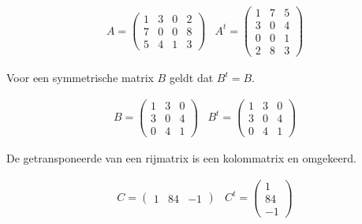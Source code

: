 \begin{voorbeeld}
	

\[ \begin{array}{ll}
A= \left( \begin{matrix}
1 & 3 & 0 & 2 \\
7 & 0 & 0 & 8 \\
5 & 4 & 1 & 3
\end{matrix} \right) &
A^t = \left( \begin{matrix}
1 & 7 & 5 \\
3 & 0 & 4 \\
0 & 0 & 1 \\
2 & 8 & 3
\end{matrix}
\right)
\end{array}
\]

\end{voorbeeld}
Voor een symmetrische matrix $B$ geldt dat $B^t =B$.\\

\begin{voorbeeld}
	

\[ \begin{array}{ll}
B= \left( \begin{matrix}
1 & 3 & 0  \\
3 & 0 & 4  \\
0 & 4 & 1 
\end{matrix} \right) &
B^t = \left( \begin{matrix}
1 & 3 & 0  \\
3 & 0 & 4  \\
0 & 4 & 1 
\end{matrix}
\right)
\end{array}
\]

\end{voorbeeld}

De getransponeerde van een rijmatrix is een kolommatrix en omgekeerd.\\


\begin{voorbeeld}
	\[ \begin{array}{ll}
C= \left( \begin{matrix}
1 & 84 & -1  
\end{matrix} \right) &
C^t = \left( \begin{matrix}
1 \\
84 \\
-1
\end{matrix}
\right)
\end{array}
\]

\end{voorbeeld}

